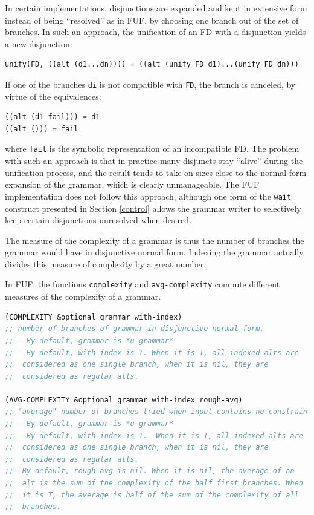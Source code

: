 \documentclass[10pt,a4paper]{report}
\begin{document}
In certain implementations, disjunctions are expanded and kept in extensive
form instead of being ``resolved'' as in FUF, by choosing one branch out
of the set of branches.  In such an approach, the unification of an FD with
a disjunction yields a new disjunction:
\begin{lstlisting}
unify(FD, ((alt (d1...dn)))) = ((alt (unify FD d1)...(unify FD dn)))
\end{lstlisting}
If one of the branches {\tt di} is not compatible with {\tt FD}, the branch is
canceled, by virtue of the equivalences:
\begin{lstlisting}[language=Lisp]
((alt (d1 fail))) = d1
((alt ())) = fail
\end{lstlisting}
where {\tt fail} is the symbolic representation of an incompatible FD.  The
problem with such an approach is that in practice many disjuncts stay
``alive'' during the unification process, and the result tends to take on
sizes close to the normal form expansion of the grammar, which is clearly
unmanageable.  The FUF implementation does not follow this approach,
although one form of the {\tt wait} construct presented in Section
\ref{control} allows the grammar writer to selectively keep certain
disjunctions unresolved when desired.

The measure of the complexity of a grammar is thus the number of branches
the grammar would have in disjunctive normal form.  Indexing the grammar
actually divides this measure of complexity by a great number.

In FUF, the functions {\tt complexity} and {\tt avg-complexity} compute
different measures of the complexity of a grammar. 

\begin{lstlisting}[language=Lisp]
(COMPLEXITY &optional grammar with-index)
;; number of branches of grammar in disjunctive normal form.
;; - By default, grammar is *u-grammar*
;; - By default, with-index is T. When it is T, all indexed alts are
;;  considered as one single branch, when it is nil, they are
;;  considered as regular alts.

(AVG-COMPLEXITY &optional grammar with-index rough-avg)
;; "average" number of branches tried when input contains no constraint. 
;; - By default, grammar is *u-grammar*
;; - By default, with-index is T.  When it is T, all indexed alts are
;;  considered as one single branch, when it is nil, they are
;;  considered as regular alts.
;;- By default, rough-avg is nil. When it is nil, the average of an
;;  alt is the sum of the complexity of the half first branches. When
;;  it is T, the average is half of the sum of the complexity of all
;;  branches. 
\end{lstlisting}
\end{document}

